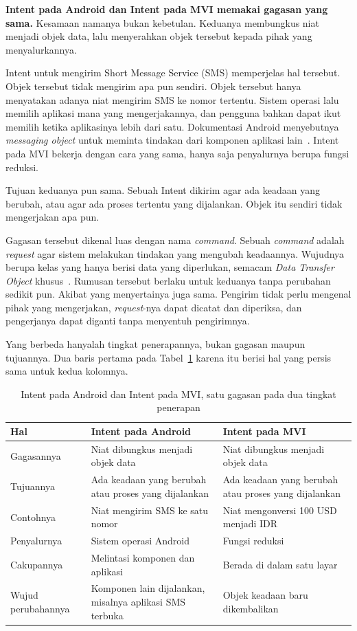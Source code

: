 \textbf{Intent pada Android dan Intent pada MVI memakai gagasan yang sama.}
Kesamaan namanya bukan kebetulan. Keduanya membungkus niat menjadi objek data,
lalu menyerahkan objek tersebut kepada pihak yang menyalurkannya.

Intent untuk mengirim Short Message Service (SMS) memperjelas hal tersebut. Objek tersebut
tidak mengirim apa pun sendiri. Objek tersebut hanya menyatakan adanya niat
mengirim SMS ke nomor tertentu. Sistem operasi lalu memilih aplikasi mana yang
mengerjakannya, dan pengguna bahkan dapat ikut memilih ketika aplikasinya lebih
dari satu. Dokumentasi Android menyebutnya \textit{messaging object} untuk meminta tindakan
dari komponen aplikasi lain~\cite{android2026intent}. Intent pada MVI bekerja
dengan cara yang sama, hanya saja penyalurnya berupa fungsi reduksi.

Tujuan keduanya pun sama. Sebuah Intent dikirim agar ada keadaan yang berubah,
atau agar ada proses tertentu yang dijalankan. Objek itu sendiri tidak
mengerjakan apa pun.

Gagasan tersebut dikenal luas dengan nama \textit{command}. Sebuah
\textit{command} adalah \textit{request} agar sistem melakukan tindakan yang mengubah
keadaannya. Wujudnya berupa kelas yang hanya berisi data yang diperlukan,
semacam \textit{Data Transfer Object} khusus~\cite{microsoft2021command}.
Rumusan tersebut berlaku untuk keduanya tanpa perubahan sedikit pun. Akibat yang
menyertainya juga sama. Pengirim tidak perlu mengenal pihak yang mengerjakan,
\textit{request}-nya dapat dicatat dan diperiksa, dan pengerjanya dapat diganti tanpa
menyentuh pengirimnya.

Yang berbeda hanyalah tingkat penerapannya, bukan gagasan maupun tujuannya.
Dua baris pertama pada Tabel~\ref{tab:dua-intent} karena itu berisi hal yang
persis sama untuk kedua kolomnya.

\begin{table}[htbp]
  \centering
  \caption{Intent pada Android dan Intent pada MVI, satu gagasan pada dua
    tingkat penerapan}
  \label{tab:dua-intent}
  \begin{tabularx}{\textwidth}{|l|X|X|}
    \hline
    \textbf{Hal} & \textbf{Intent pada Android} & \textbf{Intent pada MVI} \\
    \hline
    Gagasannya & Niat dibungkus menjadi objek data & Niat dibungkus menjadi objek data \\
    \hline
    Tujuannya & Ada keadaan yang berubah atau proses yang dijalankan & Ada keadaan yang berubah atau proses yang dijalankan \\
    \hline
    Contohnya & Niat mengirim SMS ke satu nomor & Niat mengonversi 100 USD menjadi IDR \\
    \hline
    Penyalurnya & Sistem operasi Android & Fungsi reduksi \\
    \hline
    Cakupannya & Melintasi komponen dan aplikasi & Berada di dalam satu layar \\
    \hline
    Wujud perubahannya & Komponen lain dijalankan, misalnya aplikasi SMS terbuka & Objek keadaan baru dikembalikan \\
    \hline
  \end{tabularx}
\end{table}

